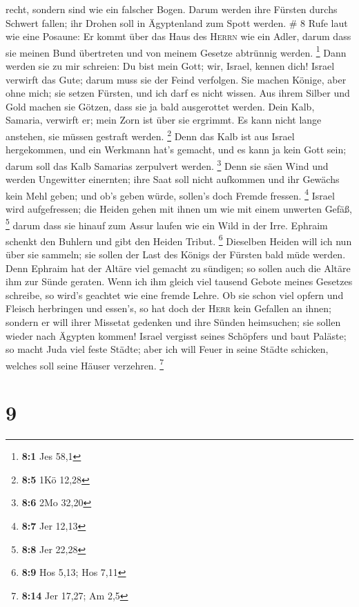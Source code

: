 recht, sondern sind wie ein falscher Bogen. Darum werden ihre Fürsten
durchs Schwert fallen; ihr Drohen soll in Ägyptenland zum Spott werden.
\# 8  Rufe laut wie eine Posaune: Er kommt über das Haus
des \textsc{Herrn} wie ein Adler, darum dass sie meinen Bund übertreten
und von meinem Gesetze abtrünnig werden. \footnote{\textbf{8:1} Jes 58,1}
 Dann werden sie zu mir schreien: Du bist mein Gott; wir,
Israel, kennen dich!  Israel verwirft das Gute; darum muss
sie der Feind verfolgen.  Sie machen Könige, aber ohne
mich; sie setzen Fürsten, und ich darf es nicht wissen. Aus ihrem Silber
und Gold machen sie Götzen, dass sie ja bald ausgerottet werden.
 Dein Kalb, Samaria, verwirft er; mein Zorn ist über sie
ergrimmt. Es kann nicht lange anstehen, sie müssen gestraft werden.
\footnote{\textbf{8:5} 1Kö 12,28}  Denn das Kalb ist aus
Israel hergekommen, und ein Werkmann hat's gemacht, und es kann ja kein
Gott sein; darum soll das Kalb Samarias zerpulvert werden. \footnote{\textbf{8:6}
  2Mo 32,20}  Denn sie säen Wind und werden Ungewitter
einernten; ihre Saat soll nicht aufkommen und ihr Gewächs kein Mehl
geben; und ob's geben würde, sollen's doch Fremde fressen. \footnote{\textbf{8:7}
  Jer 12,13}  Israel wird aufgefressen; die Heiden gehen
mit ihnen um wie mit einem unwerten Gefäß, \footnote{\textbf{8:8} Jer
  22,28}  darum dass sie hinauf zum Assur laufen wie ein
Wild in der Irre. Ephraim schenkt den Buhlern und gibt den Heiden
Tribut. \footnote{\textbf{8:9} Hos 5,13; Hos 7,11} 
Dieselben Heiden will ich nun über sie sammeln; sie sollen der Last des
Königs der Fürsten bald müde werden.  Denn Ephraim hat
der Altäre viel gemacht zu sündigen; so sollen auch die Altäre ihm zur
Sünde geraten.  Wenn ich ihm gleich viel tausend Gebote
meines Gesetzes schreibe, so wird's geachtet wie eine fremde Lehre.
 Ob sie schon viel opfern und Fleisch herbringen und
essen's, so hat doch der \textsc{Herr} kein Gefallen an ihnen; sondern
er will ihrer Missetat gedenken und ihre Sünden heimsuchen; sie sollen
wieder nach Ägypten kommen!  Israel vergisst seines
Schöpfers und baut Paläste; so macht Juda viel feste Städte; aber ich
will Feuer in seine Städte schicken, welches soll seine Häuser
verzehren. \footnote{\textbf{8:14} Jer 17,27; Am 2,5}

\hypertarget{section-4}{%
\section{9}\label{section-4}}

